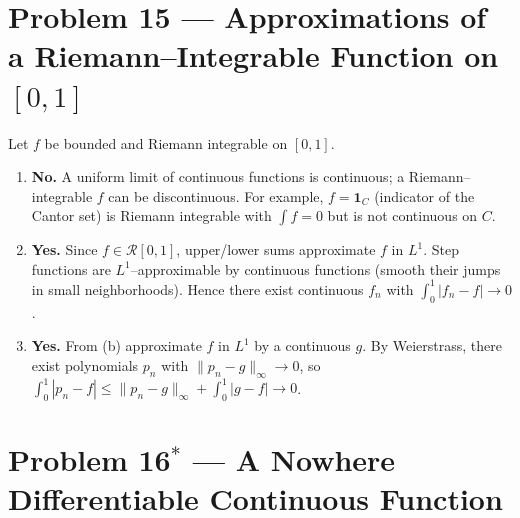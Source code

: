 \documentclass[12pt,a4paper]{article}
\theoremstyle{plain}
\theoremstyle{definition}
\theoremstyle{remark}
\theoremstyle{remark}
\begin{document}
\bigskip
\section*{Problem 15 — Approximations of a Riemann–Integrable Function on $[0,1]$}

Let $f$ be bounded and Riemann integrable on $[0,1]$.
\begin{enumerate}[label=(\alph*)]
	\item \textbf{No.} A uniform limit of continuous functions is continuous; a Riemann–integrable $f$ can be discontinuous.
	For example, $f=\mathbf 1_C$ (indicator of the Cantor set) is Riemann integrable with $\int f=0$ but is not continuous on $C$.
	\item \textbf{Yes.} Since $f\in\mathcal R[0,1]$, upper/lower sums approximate $f$ in $L^1$. Step functions are $L^1$–approximable by continuous functions (smooth their jumps in small neighborhoods). Hence there exist continuous $f_n$ with $\int_0^1|f_n-f|\to0$.
	\item \textbf{Yes.} From (b) approximate $f$ in $L^1$ by a continuous $g$. By Weierstrass, there exist polynomials $p_n$ with $\|p_n-g\|_\infty\to0$, so $\int_0^1|p_n-f|\le\|p_n-g\|_\infty+\int_0^1|g-f|\to0$.
\end{enumerate}

\bigskip
\section*{Problem 16$^\ast$ — A Nowhere Differentiable Continuous Function}
\end{document}
